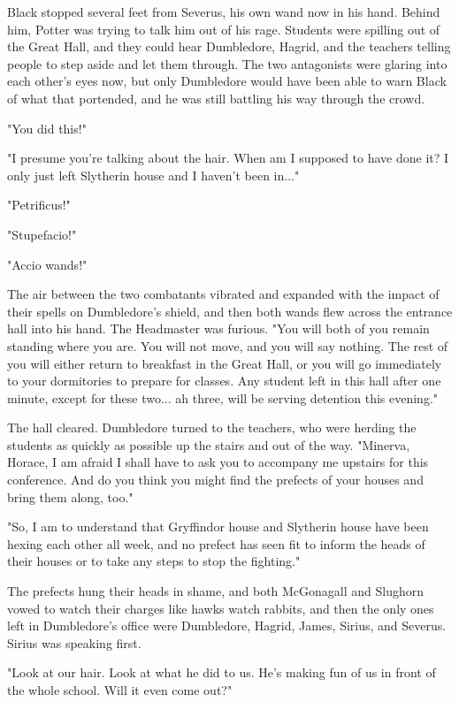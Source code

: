 Black stopped several feet from Severus, his own wand now in his hand. Behind him, Potter was trying to talk him out of his rage. Students were spilling out of the Great Hall, and they could hear Dumbledore, Hagrid, and the teachers telling people to step aside and let them through. The two antagonists were glaring into each other's eyes now, but only Dumbledore would have been able to warn Black of what that portended, and he was still battling his way through the crowd.

"You did this!"

"I presume you're talking about the hair. When am I supposed to have done it? I only just left Slytherin house and I haven't been in..."

"Petrificus!"

"Stupefacio!"

"Accio wands!"

The air between the two combatants vibrated and expanded with the impact of their spells on Dumbledore's shield, and then both wands flew across the entrance hall into his hand. The Headmaster was furious. "You will both of you remain standing where you are. You will not move, and you will say nothing. The rest of you will either return to breakfast in the Great Hall, or you will go immediately to your dormitories to prepare for classes. Any student left in this hall after one minute, except for these two... ah three, will be serving detention this evening."

The hall cleared. Dumbledore turned to the teachers, who were herding the students as quickly as possible up the stairs and out of the way. "Minerva, Horace, I am afraid I shall have to ask you to accompany me upstairs for this conference. And do you think you might find the prefects of your houses and bring them along, too."

"So, I am to understand that Gryffindor house and Slytherin house have been hexing each other all week, and no prefect has seen fit to inform the heads of their houses or to take any steps to stop the fighting."

The prefects hung their heads in shame, and both McGonagall and Slughorn vowed to watch their charges like hawks watch rabbits, and then the only ones left in Dumbledore's office were Dumbledore, Hagrid, James, Sirius, and Severus. Sirius was speaking first.

"Look at our hair. Look at what he did to us. He's making fun of us in front of the whole school. Will it even come out?"

